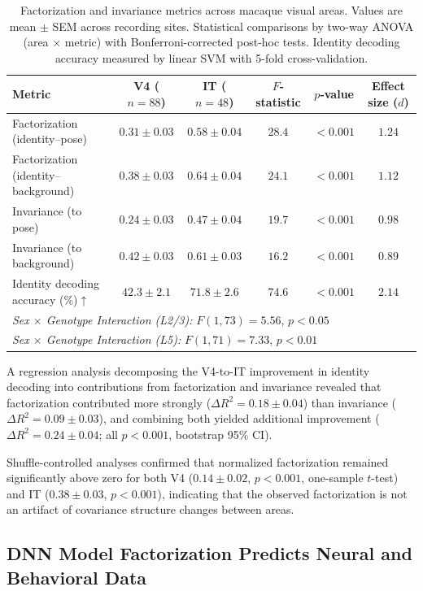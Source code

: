 \documentclass[11pt]{article}
\begin{document}
\begin{table}[H]
\centering
\caption{Factorization and invariance metrics across macaque visual areas. Values are mean $\pm$ SEM across recording sites. Statistical comparisons by two-way ANOVA (area $\times$ metric) with Bonferroni-corrected post-hoc tests. Identity decoding accuracy measured by linear SVM with 5-fold cross-validation.}
\label{tab:v4_it}
\begin{tabular}{lccccc}
\toprule
\textbf{Metric} & \textbf{V4} ($n=88$) & \textbf{IT} ($n=48$) & \textbf{$F$-statistic} & \textbf{$p$-value} & \textbf{Effect size ($d$)} \\
\midrule
Factorization (identity--pose) & $0.31 \pm 0.03$ & $0.58 \pm 0.04$ & $28.4$ & $< 0.001$ & $1.24$ \\
Factorization (identity--background) & $0.38 \pm 0.03$ & $0.64 \pm 0.04$ & $24.1$ & $< 0.001$ & $1.12$ \\
Invariance (to pose) & $0.24 \pm 0.03$ & $0.47 \pm 0.04$ & $19.7$ & $< 0.001$ & $0.98$ \\
Invariance (to background) & $0.42 \pm 0.03$ & $0.61 \pm 0.03$ & $16.2$ & $< 0.001$ & $0.89$ \\
Identity decoding accuracy (\%)$\uparrow$ & $42.3 \pm 2.1$ & $71.8 \pm 2.6$ & $74.6$ & $< 0.001$ & $2.14$ \\
\midrule
\multicolumn{6}{l}{\textit{Sex $\times$ Genotype Interaction (L2/3):} $F(1,73) = 5.56$, $p < 0.05$} \\
\multicolumn{6}{l}{\textit{Sex $\times$ Genotype Interaction (L5):} $F(1,71) = 7.33$, $p < 0.01$} \\
\bottomrule
\end{tabular}
\end{table}

A regression analysis decomposing the V4-to-IT improvement in identity decoding into contributions from factorization and invariance revealed that factorization contributed more strongly ($\Delta R^2 = 0.18 \pm 0.04$) than invariance ($\Delta R^2 = 0.09 \pm 0.03$), and combining both yielded additional improvement ($\Delta R^2 = 0.24 \pm 0.04$; all $p < 0.001$, bootstrap 95\% CI).

Shuffle-controlled analyses confirmed that normalized factorization remained significantly above zero for both V4 ($0.14 \pm 0.02$, $p < 0.001$, one-sample $t$-test) and IT ($0.38 \pm 0.03$, $p < 0.001$), indicating that the observed factorization is not an artifact of covariance structure changes between areas.

\subsection{DNN Model Factorization Predicts Neural and Behavioral Data}
\end{document}
